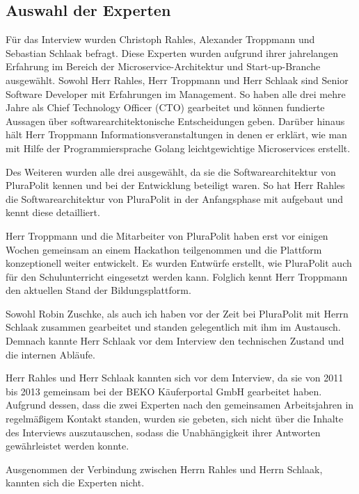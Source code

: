\subsection{Auswahl der Experten}

Für das Interview wurden Christoph Rahles, Alexander Troppmann und Sebastian Schlaak befragt.
Diese Experten wurden aufgrund ihrer jahrelangen Erfahrung im Bereich der Microservice-Architektur und Start-up-Branche ausgewählt. Sowohl Herr Rahles, Herr Troppmann und Herr Schlaak sind Senior Software Developer mit Erfahrungen im Management. So haben alle drei mehre Jahre als Chief Technology Officer (CTO) gearbeitet und können fundierte Aussagen über softwarearchitektonische Entscheidungen geben. Darüber hinaus hält Herr Troppmann Informationsveranstaltungen in denen er erklärt, wie man mit Hilfe der Programmiersprache Golang leichtgewichtige Microservices erstellt.

Des Weiteren wurden alle drei ausgewählt, da sie die Softwarearchitektur von PluraPolit kennen und bei der Entwicklung beteiligt waren. So hat Herr Rahles die Softwarearchitektur von PluraPolit in der Anfangsphase mit aufgebaut und kennt diese detailliert.

Herr Troppmann und die Mitarbeiter von PluraPolit haben erst vor einigen Wochen gemeinsam an einem Hackathon teilgenommen und die Plattform konzeptionell weiter entwickelt. Es wurden Entwürfe erstellt, wie PluraPolit auch für den Schulunterricht eingesetzt werden kann. Folglich kennt Herr Troppmann den aktuellen Stand der Bildungsplattform.

Sowohl Robin Zuschke, als auch ich haben vor der Zeit bei PluraPolit mit Herrn Schlaak zusammen gearbeitet und standen gelegentlich mit ihm im Austausch. Demnach kannte Herr Schlaak vor dem Interview den technischen Zustand und die internen Abläufe.

Herr Rahles und Herr Schlaak kannten sich vor dem Interview, da sie von 2011 bis 2013 gemeinsam bei der BEKO Käuferportal GmbH gearbeitet haben. Aufgrund dessen, dass die zwei Experten nach den gemeinsamen Arbeitsjahren in regelmäßigem Kontakt standen, wurden sie gebeten, sich nicht über die Inhalte des Interviews auszutauschen, sodass die Unabhängigkeit ihrer Antworten gewährleistet werden konnte.

Ausgenommen der Verbindung zwischen Herrn Rahles und Herrn Schlaak, kannten sich die Experten nicht.
